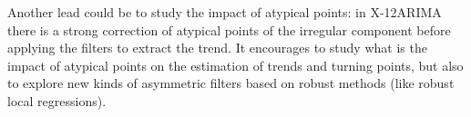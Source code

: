 \documentclass[
  12pt,
  ,
  a4paper]{article}
\newcommand\1{\mathds{1}}
\begin{document}
Another lead could be to study the impact of atypical points: in X-12ARIMA there is a strong correction of atypical points of the irregular component before applying the filters to extract the trend.
It encourages to study what is the impact of atypical points on the estimation of trends and turning points, but also to explore new kinds of asymmetric filters based on robust methods (like robust local regressions).

\newpage

\printbibliography[title=References]
\end{document}
